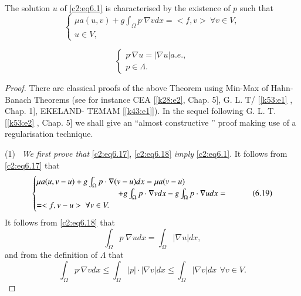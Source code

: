 \begin{theorem}\label{c2:thm6.3}%
The solution $u$ of \eqref{c2:eq6.1} is characterised by the existence
of $p$ such that  
\begin{equation}
\begin{cases}
\mu a (u, v) + g \int_\Omega p^. \nabla v dx = < f, v > ~
\forall v \in V,\\ 
u \in V,
\end{cases}
\tag{6.17}\label{c2:eq6.17}
\end{equation}

\begin{equation}
\begin{cases}
p^. \nabla u= | \nabla u |a . e., \\
p \in \Lambda .
\end{cases}
\tag{6.18}\label{c2:eq6.18}
 \end{equation} 
\end{theorem}

\begin{proof}
There are classical proofs of the above Theorem using Min-Max of
Hahn-Banach Theorems (see for instance CEA [\ref{k28:e2}, Chap. 5],
G. L. T/ [\ref{k53:e1} ,
  Chap. 1], EKELAND- TEMAM [\ref{k43:e1}]). In the sequel following
G. L. T. [\ref{k53:e2} ,
  Chap. 5] we shall give an ``almost constructive '' proof making use
of a regularisation technique. 

\medskip
 \noindent (1)~ {\em We first prove that } \eqref{c2:eq6.17}, \eqref{c2:eq6.18} {\em imply}
   \eqref{c2:eq6.1}. It follows from \eqref{c2:eq6.17} that  
\begin{equation}
\begin{cases}
\mu a (u, v -u) + g \int_\Omega p \cdot \nabla (v - u) dx = \mu a
(v- u)\\ 
\hspace{3.5cm}+ g \int_{\Omega} p\cdot \nabla v dx - g \int_\Omega
p\cdot \nabla u dx =\\ 
= < f, v-u > ~\forall v \in V.
\end{cases}
\tag{6.19}\label{c2:eq6.19}
\end{equation}
It follows from \eqref{c2:eq6.18} that 
\begin{equation}
\int_\Omega p^. \nabla u dx = \int_\Omega |\nabla u |
dx, \tag{6.20}\label{c2:eq6.20} 
\end{equation}
and from the definition of $\Lambda $ that 
\begin{equation}
\int_\Omega p^. \nabla v dx \leq \int_\Omega |p| \cdot|
\nabla v | dx \leq \int_\Omega |\nabla v |dx ~\, \forall  v
\in V. \tag{6.21}\label{c2:eq6.21} 
\end{equation}
\end{proof}

